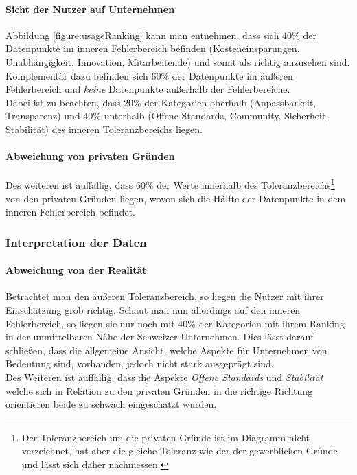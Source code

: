 \documentclass[a4paper]{article}
\begin{document}
                \paragraph{Sicht der Nutzer auf Unternehmen}
                    Abbildung \ref{figure:usageRanking} kann man entnehmen, dass sich $40\%$ der Datenpunkte im inneren Fehlerbereich befinden ({\scriptsize Kosteneinsparungen, Unabhängigkeit, Innovation, Mitarbeitende}) und somit als richtig anzusehen sind. Komplementär dazu befinden sich $60\%$ der Datenpunkte im äußeren Fehlerbereich und \emph{keine} Datenpunkte außerhalb der Fehlerbereiche.\\
                    Dabei ist zu beachten, dass $20\%$ der Kategorien oberhalb ({\scriptsize Anpassbarkeit, Transparenz}) und $40\%$ unterhalb ({\scriptsize Offene Standards, Community, Sicherheit, Stabilität}) des inneren Toleranzbereichs liegen.
                    
                \paragraph{Abweichung von privaten Gründen}
                    Des weiteren ist auffällig, dass $60\%$ der Werte innerhalb des Toleranzbereichs\footnote{Der Toleranzbereich um die privaten Gründe ist im Diagramm nicht verzeichnet, hat aber die gleiche Toleranz wie der der gewerblichen Gründe und lässt sich daher nachmessen.} von den privaten Gründen liegen, wovon sich die Hälfte der Datenpunkte in dem inneren Fehlerbereich befindet.
                               
            \subsubsection{Interpretation der Daten}
                \paragraph{Abweichung von der Realität}
                    Betrachtet man den äußeren Toleranzbereich, so liegen die Nutzer mit ihrer Einschätzung grob richtig. Schaut man nun allerdings auf den inneren Fehlerbereich, so liegen sie nur noch mit $40\%$ der Kategorien mit ihrem Ranking in der unmittelbaren Nähe der Schweizer Unternehmen. Dies lässt darauf schließen, dass die allgemeine Ansicht, welche Aspekte für Unternehmen von Bedeutung sind, vorhanden, jedoch nicht stark ausgeprägt sind.\\
                    Des Weiteren ist auffällig, dass die Aspekte \emph{Offene Standards} und \emph{Stabilität} welche sich in Relation zu den privaten Gründen in die richtige Richtung orientieren beide zu schwach eingeschätzt wurden. %
                    
\end{document}
